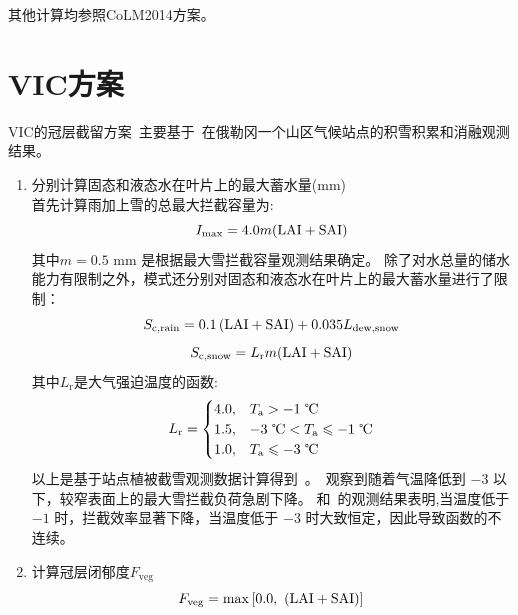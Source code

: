 其他计算均参照CoLM2014方案。


\section{VIC方案}
VIC的冠层截留方案~\citep{liang1994simple,hamman2018variable}主要基于~\citet{storck2002measurement}在俄勒冈一个山区气候站点的积雪积累和消融观测结果。
\begin{enumerate}
  \item 分别计算固态和液态水在叶片上的最大蓄水量(mm)\\
    首先计算雨加上雪的总最大拦截容量为:
    \begin{equation}
      I_{\mathrm{max}} = 4.0 m ({\rm LAI}+{\rm SAI})
    \end{equation}
    其中$m=0.5$ mm 是根据最大雪拦截容量观测结果确定。
    除了对水总量的储水能力有限制之外，模式还分别对固态和液态水在叶片上的最大蓄水量进行了限制：
    \begin{equation}
      S_{\mathrm{c,rain}}=0.1\left({\rm LAI}+{\rm SAI}\right)+0.035 L_{\mathrm{dew,snow}}\\
    \end{equation}
    \begin{equation}
      S_{\mathrm{c,snow}}=L_{\mathrm {r}}  m ({\rm LAI}+{\rm SAI})
    \end{equation}
    其中$L_{\mathrm {r}} $是大气强迫温度的函数:
    \begin{equation}
      L_{\mathrm {r}}  = \begin{cases}
        4.0, & T_{\mathrm {a}}  > -1 \text{ \textcelsius}\\
        1.5, & -3 \text{ \textcelsius} < T_{\mathrm {a}}  \leqslant -1 \text{ \textcelsius}\\
        1.0, & T_{\mathrm {a}}  \leqslant -3 \text{ \textcelsius}
      \end{cases}
    \end{equation}
    以上是基于站点植被截雪观测数据计算得到~\citep{storck2002measurement}。\citet{kobayashi1987snow}~观察到随着气温降低到 $-3$ \textcelsius 以下，较窄表面上的最大雪拦截负荷急剧下降。 \citet{kobayashi1987snow}和~\citet{pfister1999snow}的观测结果表明,当温度低于 $-1$ \textcelsius 时，拦截效率显著下降，当温度低于 $-3$ \textcelsius 时大致恒定，因此导致函数的不连续。

  \item 计算冠层闭郁度$F_{\mathrm{veg}}$
    \begin{equation}
      F_{\mathrm{veg}} = \max\left[0.0,\ ({\rm LAI}+{\rm SAI})\right]
    \end{equation}


\end{enumerate}
